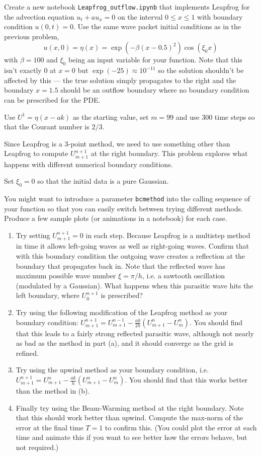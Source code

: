 \documentclass[10pt]{article}
\begin{document}
Create a new notebook \verb+Leapfrog_outflow.ipynb+ that 
implements Leapfrog for the advection equation $u_t + au_x=0$ on the
interval $0\leq x\leq 1$ with boundary condition $u(0,t) = 0$.
Use the same wave packet initial conditions as in the previous problem,
\[
u(x,0) = \eta(x) = \exp(-\beta(x-0.5)^2) \cos(\xi_0 x)
\]
with $\beta = 100$ and $\xi_0$ being an input variable for your function.
Note that this isn't exactly 0 at $x=0$ but $\exp(-25)\approx 10^{-11}$ so
the solution shouldn't be affected by this --- the true solution simply
propagates to the right and the boundary $x=1.5$ should be an outflow
boundary where no boundary condition can be prescribed for the PDE.  

Use $U^1= \eta(x - ak)$ as the starting value, set $m=99$ and use 300 time
steps so that the Courant number is $2/3$.

Since Leapfrog is a 3-point method, we need to use something other than
Leapfrog to compute $U_{m+1}^{n+1}$ at the right boundary.  
This problem explores what happens with different numerical boundary conditions.

Set $\xi_0 =0$ so that the initial data is a pure Gaussian.

You might want to introduce a parameter \verb+bcmethod+ into the calling
sequence of your function so that you can easily switch between trying
different methods.   Produce a few sample plots (or animations in a
notebook) for each case.

\begin{enumerate} 
\item Try setting $U_{m+1}^{n+1}= 0$ in each step.  Because Leapfrog is a
multistep method in time it allows left-going waves as well as right-going
waves.  Confirm that with this boundary condition the outgoing wave creates
a reflection at the boundary that propagates back in.  Note that the
reflected wave has maximum possible wave number $\xi = \pi/h$, i.e. a
sawtooth oscillation (modulated by a Gaussian). What happens when this
parasitic wave hits the left boundary, where $U_0^{n+1}$ is prescribed?

\item Try using the following modification of the Leapfrog method as
your boundary condition:
$U_{m+1}^{n+1} = U_{m+1}^{n-1} - \frac{ak}{2h}(U_{m+1}^n - U_m^n)$.
You should find that this leads to a fairly strong reflected parasitic wave,
although not nearly as bad as the method in part (a), and it should converge
as the grid is refined.

\item Try using the upwind method as your boundary condition,
i.e. $U_{m+1}^{n+1} = U_{m+1}^{n} - \frac{ak}{h}(U_{m+1}^n - U_m^n)$.
You should find that this works better than the method in (b).

\item Finally try using the Beam-Warming method at the right boundary.
Note that this should work better than upwind. Compute the max-norm of the
error at the final time $T=1$ to confirm this.
(You could plot the error at each time and animate this if you want to see
better how the errors behave, but not required.)

\end{enumerate} 
\end{document}
